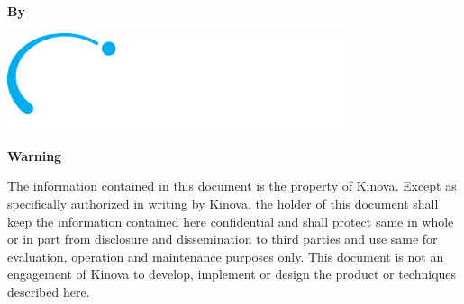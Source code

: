 \begin{titlepage}

  \vspace*{10mm}
  \begin{center}
    \Huge{\textbf{\doctitle}}

    \vspace*{15mm}
    \Large{\textbf{\docrevision}}

    \Large{\textbf{\docdate}}

    \vspace*{15mm}
    \textbf{By}

    \Large{\textbf{\docauthor}}
  \end{center}

  \vspace*{10mm}
  \hspace{-5cm}

  \vspace*{-50mm}

  \begin{center}
    \includegraphics[width=10cm]{images/logo_kinova_inv}
  \end{center}

  \vspace*{20mm}
  \noindent
  \textbf{Warning}

  \noindent
  The information contained in this document is the property of Kinova. Except as
  specifically authorized in writing by Kinova, the holder of this document shall keep the
  information contained here confidential and shall protect same in whole or in part from
  disclosure and dissemination to third parties and use same for evaluation, operation and
  maintenance purposes only. This document is not an engagement of Kinova to develop,
  implement or design the product or techniques described here.

\end{titlepage}

\newpage

